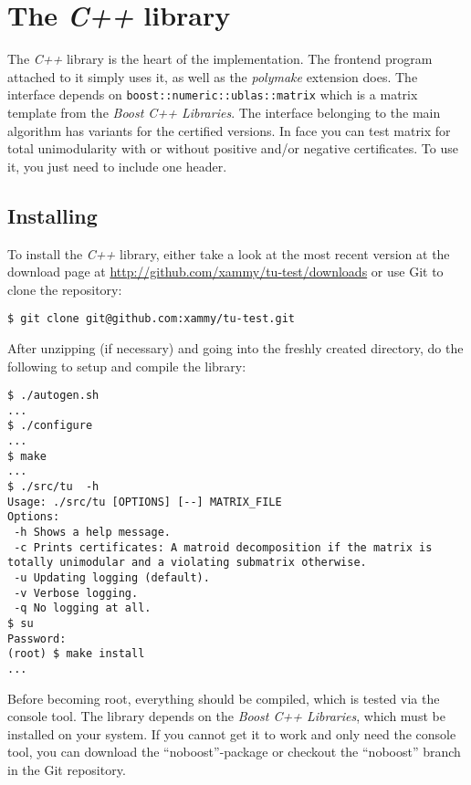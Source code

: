 \documentclass[12pt]{article}
\newcommand{\Cpp}{{\em C++ }}
\newcommand{\Polymake}{{\em polymake }}
\newcommand{\Boost}{{\em Boost C++ Libraries}}
\begin{document}
\section{The \Cpp library}

The \Cpp library is the heart of the implementation.
The frontend program attached to it simply uses it, as well as the \Polymake extension does.
The interface depends on {\tt boost::numeric::ublas::matrix} which is a matrix template from the \Boost \cite{Boost}.
The interface belonging to the main algorithm has variants for the certified versions. In face you can test matrix
for total unimodularity with or without positive and/or negative certificates. To use it, you just need to include one header.

\subsection{Installing}

To install the \Cpp library, either take a look at the most recent version at the download page at
\url{http://github.com/xammy/tu-test/downloads} or use Git to clone the repository:

{\tiny
{}
\begin{lstlisting}
$ git clone git@github.com:xammy/tu-test.git
\end{lstlisting}}

\parindent 0mm
After unzipping (if necessary) and going into the freshly created directory, do the following to setup and compile the library:

{\tiny
{}
\begin{lstlisting}
$ ./autogen.sh
...
$ ./configure
...
$ make
...
$ ./src/tu  -h
Usage: ./src/tu [OPTIONS] [--] MATRIX_FILE
Options:
 -h Shows a help message.
 -c Prints certificates: A matroid decomposition if the matrix is totally unimodular and a violating submatrix otherwise.
 -u Updating logging (default).
 -v Verbose logging.
 -q No logging at all.
$ su
Password: 
(root) $ make install
...
\end{lstlisting}}

Before becoming root, everything should be compiled, which is tested via the console tool.
The library depends on the \Boost \cite{Boost}, which must be installed on your system. If you cannot get it to work and
only need the console tool, you can download the ``noboost''-package or checkout the ``noboost'' branch in the Git repository.
\end{document}

